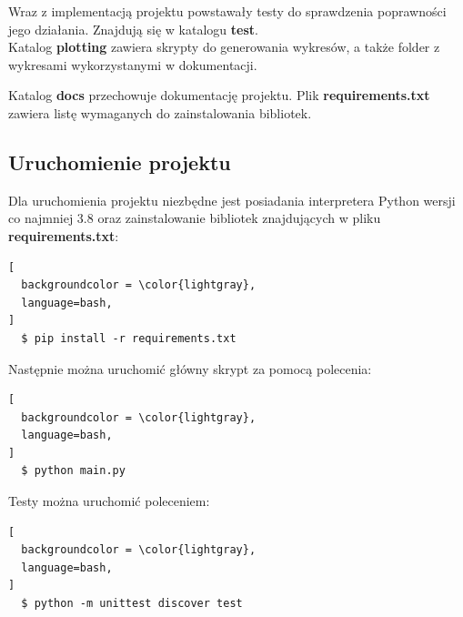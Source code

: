 \documentclass[12pt,a4paper]{article}
\begin{document}
Wraz z implementacją projektu powstawały testy do sprawdzenia poprawności
jego działania. Znajdują się w katalogu \textbf{test}. \\

Katalog \textbf{plotting} zawiera skrypty do generowania wykresów,
a także folder z wykresami wykorzystanymi w dokumentacji.

Katalog \textbf{docs} przechowuje dokumentację projektu.
Plik \textbf{requirements.txt} zawiera listę wymaganych do zainstalowania
bibliotek.

\subsection{Uruchomienie projektu}

Dla uruchomienia projektu niezbędne jest posiadania interpretera Python wersji co najmniej 3.8
oraz zainstalowanie bibliotek znajdujących w pliku \textbf{requirements.txt}:

\begin{lstlisting}[
  backgroundcolor = \color{lightgray},
  language=bash,
]
  $ pip install -r requirements.txt
\end{lstlisting}

\bigskip

Następnie można uruchomić główny skrypt za pomocą polecenia:

\begin{lstlisting}[
  backgroundcolor = \color{lightgray},
  language=bash,
]
  $ python main.py
\end{lstlisting}

Testy można uruchomić poleceniem:

\begin{lstlisting}[
  backgroundcolor = \color{lightgray},
  language=bash,
]
  $ python -m unittest discover test
\end{lstlisting}
\end{document}
